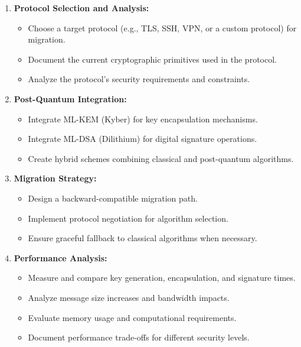 \documentclass[10pt,a4paper,american]{exam}
\begin{document}
\begin{enumerate}
	\item \textbf{Protocol Selection and Analysis:}
	      \begin{itemize}
		      \item Choose a target protocol (e.g., TLS, SSH, VPN, or a custom protocol) for migration.
		      \item Document the current cryptographic primitives used in the protocol.
		      \item Analyze the protocol's security requirements and constraints.
	      \end{itemize}

	\item \textbf{Post-Quantum Integration:}
	      \begin{itemize}
		      \item Integrate ML-KEM (Kyber) for key encapsulation mechanisms.
		      \item Integrate ML-DSA (Dilithium) for digital signature operations.
		      \item Create hybrid schemes combining classical and post-quantum algorithms.
	      \end{itemize}

	\item \textbf{Migration Strategy:}
	      \begin{itemize}
		      \item Design a backward-compatible migration path.
		      \item Implement protocol negotiation for algorithm selection.
		      \item Ensure graceful fallback to classical algorithms when necessary.
	      \end{itemize}

	\item \textbf{Performance Analysis:}
	      \begin{itemize}
		      \item Measure and compare key generation, encapsulation, and signature times.
		      \item Analyze message size increases and bandwidth impacts.
		      \item Evaluate memory usage and computational requirements.
		      \item Document performance trade-offs for different security levels.
	      \end{itemize}
\end{enumerate}
\end{document}
